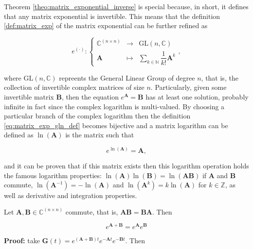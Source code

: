 	Theorem \ref{theo:matrix_exponential_inverse} is special because, in short, it defines that any matrix exponential is invertible. This means that the definition \ref{def:matrix_exp} of the matrix exponential can be further refined as

\begin{equation} e^{\left(\cdot\right)}: \left\{\begin{array}{rcl} \mathbb{C}^{\left(n\times n\right)} &\to& \text{GL}\left(n,\mathbb{C}\right) \\[3mm] \mathbf{A} &\mapsto&  \displaystyle\sum\limits_{k\in\mathbb{N}} \dfrac{1}{k!} \mathbf{A}^k\end{array}\right. \label{eq:matrix_exp_gln_def} ,\end{equation}

	\noindent where $\text{GL}\left(n,\mathbb{C}\right)$ repreents the General Linear Group of degree $n$, that is, the collection of invertible complex matrices of size $n$. Particularly, given some invertible matrix $\mathbf{B}$, then the equation $e^{\mathbf{A}} = \mathbf{B}$ has at least one solution, probably infinite in fact since the complex logarithm is multi-valued. By choosing a particular branch of the complex logarithm then the definition \eqref{eq:matrix_exp_gln_def} becomes bijective and a matrix logarithm can be defined as $\ln\left(\mathbf{A}\right)$ is the matrix such that 

\begin{equation} e^{\ln\left(\mathbf{A}\right)} = \mathbf{A}, \end{equation}

	\noindent and it can be proven that if this matrix exists then this logarithm operation holds the famous logarithm properties: $\ln\left(\mathbf{A}\right)\ln\left(\mathbf{B}\right) = \ln\left(\mathbf{AB}\right)$ if $\mathbf{A}$ and $\mathbf{B}$ commute, $\ln\left(\mathbf{A}^{-1}\right) = -\ln\left(\mathbf{A}\right)$ and $\ln\left(\mathbf{A}^k\right) = k\ln\left(\mathbf{A}\right)$ for $k\in\mathbb{Z}$, as well as derivative and integration properties.

\begin{theorem} \label{theo:matrix_exponential_sum} %
	Let $\mathbf{A},\mathbf{B}\in\mathbb{C}^{(n\times n)}$ commute, that is, $\mathbf{AB} = \mathbf{BA}$. Then

\begin{equation} e^{\mathbf{A} + \mathbf{B}} = e^{\mathbf{A}}e^{\mathbf{B}} \end{equation}
\end{theorem}
\textbf{Proof:} take $\mathbf{G}(t) = e^{\left(\mathbf{A}+\mathbf{B}\right)t}e^{-\mathbf{A}t}e^{-\mathbf{B}t}$. Then

